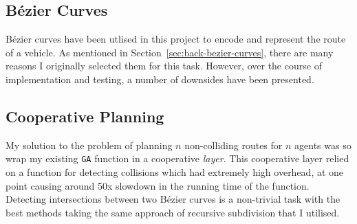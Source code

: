 
\subsection{Bézier Curves}

Bézier curves have been utlised in this project to encode and represent the route of a vehicle. As mentioned in Section~\ref{sec:back-bezier-curves}, there are many reasons I originally selected them for this task. However, over the course of implementation and testing, a number of downsides have been presented.

\subsection{Cooperative Planning}
\label{subsec:eval-cooperativeplanning}

My solution to the problem of planning $n$ non-colliding routes for $n$ agents was so wrap my existing \texttt{GA} function in a cooperative \textit{layer}. This cooperative layer relied on a function for detecting collisions which had extremely high overhead, at one point causing around 50x slowdown in the running time of the function. Detecting intersections between two Bézier curves is a non-trivial task with the best methods taking the same approach of recursive subdivision that I utilised.


